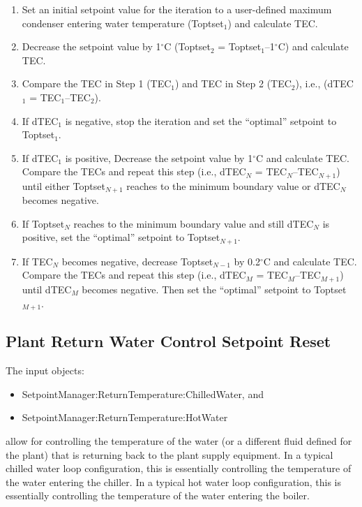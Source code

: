 \begin{enumerate}
\item Set an initial setpoint value for the iteration to a user-defined maximum condenser entering water temperature (Toptset\(_{1}\)) and calculate TEC.
\item Decrease the setpoint value by 1\(^{\circ}\)C (Toptset\(_{2}\) = Toptset\(_{1}\)--1\(^{\circ}\)C) and calculate TEC.
\item Compare the TEC in Step 1 (TEC\(_{1}\)) and TEC in Step 2 (TEC\(_{2}\)), i.e., (dTEC\(_{1}\) = TEC\(_{1}\)--TEC\(_{2}\)).
\item If dTEC\(_{1}\) is negative, stop the iteration and set the ``optimal'' setpoint to Toptset\(_{1}\).
\item If dTEC\(_{1}\) is positive, Decrease the setpoint value by 1\(^{\circ}\)C and calculate TEC. Compare the TECs and repeat this step (i.e., dTEC\(_{N}\) = TEC\(_{N}\)--TEC\(_{N+1}\)) until either Toptset\(_{N+1}\) reaches to the minimum boundary value or dTEC\(_{N}\) becomes negative.
\item If Toptset\(_{N}\) reaches to the minimum boundary value and still dTEC\(_{N}\) is positive, set the ``optimal'' setpoint to Toptset\(_{N+1}\).
\item If TEC\(_{N}\) becomes negative, decrease Toptset\(_{N-1}\) by 0.2\(^{\circ}\)C and calculate TEC. Compare the TECs and repeat this step (i.e., dTEC\(_{M}\) = TEC\(_{M}\)--TEC\(_{M+1}\)) until dTEC\(_{M}\) becomes negative. Then set the ``optimal'' setpoint to Toptset\(_{M+1}\).
\end{enumerate}

\subsection{Plant Return Water Control Setpoint Reset}\label{plant-return-water-control-setpoint-reset}

The input objects:

\begin{itemize}
\item
  SetpointManager:ReturnTemperature:ChilledWater, and
\item
  SetpointManager:ReturnTemperature:HotWater
\end{itemize}

allow for controlling the temperature of the water (or a different fluid defined for the plant) that is returning back to the plant supply equipment. In a typical chilled water loop configuration, this is essentially controlling the temperature of the water entering the chiller. In a typical hot water loop configuration, this is essentially controlling the temperature of the water entering the boiler.

